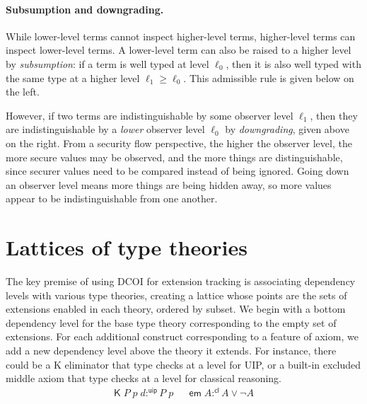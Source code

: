 \documentclass{article}
\newcommand{\kw}[1]{\mathsf{#1}}
\begin{document}
\paragraph{Subsumption and downgrading.}
While lower-level terms cannot inspect higher-level terms,
higher-level terms can inspect lower-level terms.
A lower-level term can also be raised to a higher level by \emph{subsumption}:
if a term is well typed at level $\ell_0$,
then it is also well typed with the same type at a higher level $\ell_1 \ge \ell_0$.
This admissible rule is given below on the left.
%
%
However, if two terms are indistinguishable by some observer level $\ell_1$,
then they are indistinguishable by a \emph{lower} observer level $\ell_0$ by \emph{downgrading},
given above on the right.
From a security flow perspective, the higher the observer level,
the more secure values may be observed,
and the more things are distinguishable,
since securer values need to be compared instead of being ignored.
Going down an observer level means more things are being hidden away,
so more values appear to be indistinguishable from one another.

\section{Lattices of type theories} \label{sec:lattice}

The key premise of using DCOI for extension tracking
is associating dependency levels with various type theories,
creating a lattice whose points are the sets of extensions
enabled in each theory, ordered by subset.
We begin with a bottom dependency level for the base type theory
corresponding to the empty set of extensions.
For each additional construct corresponding to a feature of axiom,
we add a new dependency level above the theory it extends.
For instance, there could be a K eliminator that type checks at a level for UIP,
or a built-in excluded middle axiom that type checks at a level for classical reasoning.
%
\begin{align*}
  \kw{K} \; P \; p \; d :^{\kw{uip}} P \; p &&
  \kw{em} \; A :^{\kw{cl}} A \vee \neg A
\end{align*}
\vspace{-1.5\baselineskip}
\end{document}
